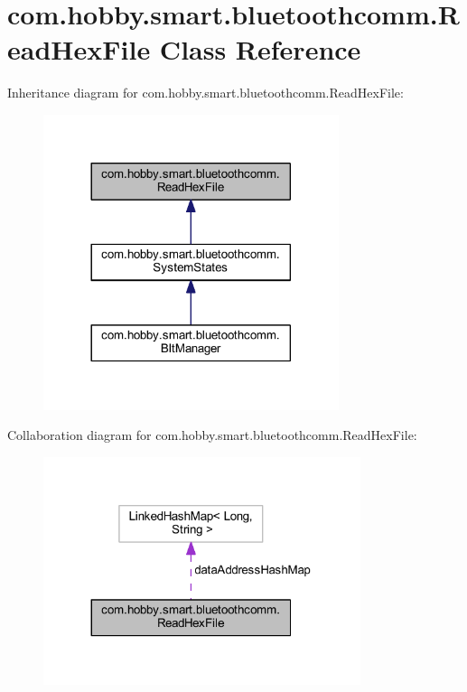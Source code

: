 \hypertarget{classcom_1_1hobby_1_1smart_1_1bluetoothcomm_1_1_read_hex_file}{}\section{com.\+hobby.\+smart.\+bluetoothcomm.\+Read\+Hex\+File Class Reference}
\label{classcom_1_1hobby_1_1smart_1_1bluetoothcomm_1_1_read_hex_file}


Inheritance diagram for com.\+hobby.\+smart.\+bluetoothcomm.\+Read\+Hex\+File\+:\nopagebreak
\begin{figure}[H]
\begin{center}
\leavevmode
\includegraphics[width=245pt]{classcom_1_1hobby_1_1smart_1_1bluetoothcomm_1_1_read_hex_file__inherit__graph}
\end{center}
\end{figure}


Collaboration diagram for com.\+hobby.\+smart.\+bluetoothcomm.\+Read\+Hex\+File\+:\nopagebreak
\begin{figure}[H]
\begin{center}
\leavevmode
\includegraphics[width=263pt]{classcom_1_1hobby_1_1smart_1_1bluetoothcomm_1_1_read_hex_file__coll__graph}
\end{center}
\end{figure}
